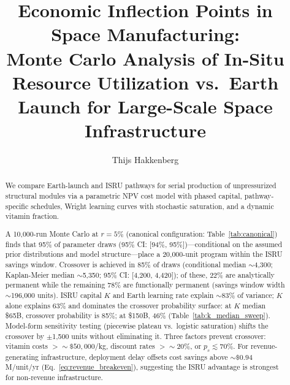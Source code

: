 \documentclass[preprint,12pt]{elsarticle}
\begin{document}
\begin{frontmatter}

\title{Economic Inflection Points in Space Manufacturing:\\ Monte Carlo Analysis of In-Situ Resource Utilization vs.\ Earth Launch for Large-Scale Space Infrastructure}

\author[dyson]{Thijs Hakkenberg}

\address[dyson]{Project Dyson, Open Research Initiative}

\begin{abstract}
We compare Earth-launch and ISRU pathways for serial production of unpressurized structural modules via a parametric NPV cost model with phased capital, pathway-specific schedules, Wright learning curves with stochastic saturation, and a dynamic vitamin fraction.

A 10{,}000-run Monte Carlo at $r = 5\%$ (canonical configuration: Table~\ref{tab:canonical}) finds that 95\% of parameter draws (95\% CI: [94\%, 95\%])---conditional on the assumed prior distributions and model structure---place a 20{,}000-unit program within the ISRU savings window. Crossover is achieved in 85\% of draws (conditional median ${\sim}$4{,}300; Kaplan-Meier median ${\sim}$5{,}350; 95\% CI: [4{,}200, 4{,}420]); of these, 22\% are analytically permanent while the remaining 78\% are functionally permanent (savings window width ${\sim}$196{,}000 units). ISRU capital $K$ and Earth learning rate explain ${\sim}$83\% of variance; $K$ alone explains 63\% and dominates the crossover probability surface: at $K$ median \$65B, crossover probability is 85\%; at \$150B, 46\% (Table~\ref{tab:k_median_sweep}). Model-form sensitivity testing (piecewise plateau vs.\ logistic saturation) shifts the crossover by $\pm$1{,}500 units without eliminating it. Three factors prevent crossover: vitamin costs $> {\sim}\$50{,}000$/kg, discount rates $> {\sim}20\%$, or $p_s \lesssim 70\%$. For revenue-generating infrastructure, deployment delay offsets cost savings above ${\sim}\$0.94$M/unit/yr (Eq.~\ref{eq:revenue_breakeven}), suggesting the ISRU advantage is strongest for non-revenue infrastructure.
\end{abstract}


\end{frontmatter}
\end{document}
